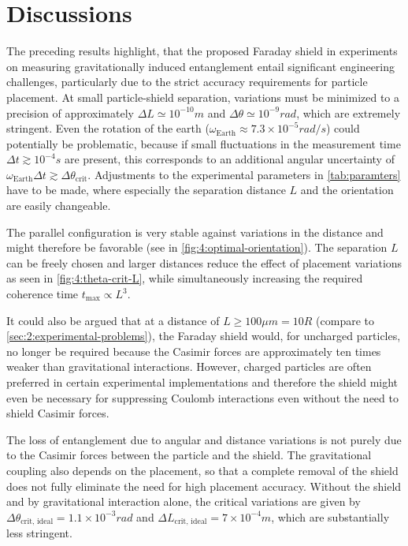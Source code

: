\section{Discussions}\label{sec:4:discussion}
The preceding results highlight, that the proposed Faraday shield in experiments on measuring gravitationally induced entanglement entail significant engineering challenges, particularly due to the strict accuracy requirements for particle placement.
At small particle-shield separation, variations must be minimized to a precision of approximately $\Delta L \simeq 10^{-10}\si{m}$ and $\Delta \theta \simeq 10^{-9}\si{rad}$, which are extremely stringent.
Even the rotation of the earth ($\omega_\mathrm{Earth}\approx 7.3\times 10^{-5}\si{rad/s}$) could potentially be problematic, because if small fluctuations in the measurement time $\Delta t \gtrsim 10^{-4}\si{s}$ are present, this corresponds to an additional angular uncertainty of $\omega_\mathrm{Earth}\Delta t \gtrsim \Delta \theta_\mathrm{crit}$.
Adjustments to the experimental parameters in \cref{tab:paramters} have to be made, where especially the separation distance $L$ and the orientation are easily changeable.

The parallel configuration is very stable against variations in the distance and might therefore be favorable (see in \cref{fig:4:optimal-orientation}).
The separation $L$ can be freely chosen and larger distances reduce the effect of placement variations as seen in \cref{fig:4:theta-crit-L}, while simultaneously increasing the required coherence time $t_\mathrm{max} \propto L^3$.

It could also be argued that at a distance of $L \geq 100\si{\mu m} = 10 R$ (compare to \cref{sec:2:experimental-problems}), the Faraday shield would, for uncharged particles, no longer be required because the Casimir forces are approximately ten times weaker than gravitational interactions.
However, charged particles are often preferred in certain experimental implementations and therefore the shield might even be necessary for suppressing Coulomb interactions even without the need to shield Casimir forces.

The loss of entanglement due to angular and distance variations is not purely due to the Casimir forces between the particle and the shield.
The gravitational coupling also depends on the placement, so that a complete removal of the shield does not fully eliminate the need for high placement accuracy.
Without the shield and by gravitational interaction alone, the critical variations are given by $\Delta \theta_\mathrm{crit,\,ideal} = 1.1 \times 10^{-3}\si{rad}$ and $\Delta L_\mathrm{crit,\,ideal} = 7\times 10^{-4}\si{m}$, which are substantially less stringent.

